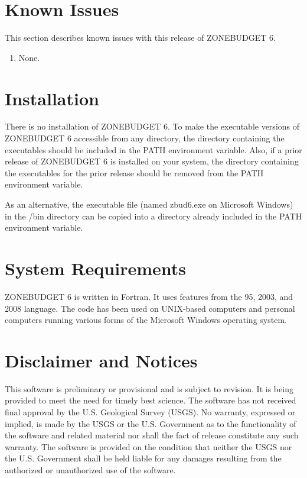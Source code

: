 \documentclass[11pt,twoside,twocolumn]{usgsreport}
\begin{document}
\section{Known Issues}
This section describes known issues with this release of ZONEBUDGET 6.

\begin{enumerate}
\item None.
\end{enumerate}


\section{Installation}
There is no installation of ZONEBUDGET 6.  To make the executable versions of ZONEBUDGET 6 accessible from any directory, the directory containing the executables should be included in the PATH environment variable.  Also, if a prior release of ZONEBUDGET 6 is installed on your system, the directory containing the executables for the prior release should be removed from the PATH environment variable.

As an alternative, the executable file (named zbud6.exe on Microsoft Windows) in the \modflowversion{}/bin directory can be copied into a directory already included in the PATH environment variable.

\section{System Requirements}
ZONEBUDGET 6 is written in Fortran.  It uses features from the 95, 2003, and 2008 language.  The code has been used on UNIX-based computers and personal computers running various forms of the Microsoft Windows operating system.

\section{Disclaimer and Notices}

This software is preliminary or provisional and is subject to revision. It is being provided to meet the need for timely best science. The software has not received final approval by the U.S. Geological Survey (USGS). No warranty, expressed or implied, is made by the USGS or the U.S. Government as to the functionality of the software and related material nor shall the fact of release constitute any such warranty. The software is provided on the condition that neither the USGS nor the U.S. Government shall be held liable for any damages resulting from the authorized or unauthorized use of the software.


\justifying
\vspace*{\fill}
\clearpage
\pagestyle{backofreport}
\makebackcover
\end{document}
